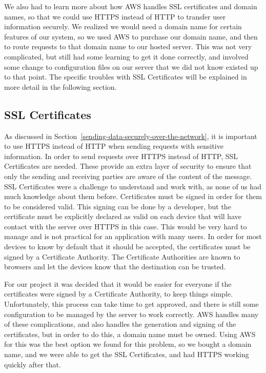 \documentclass[12pt]{report}
\let\Oldsubsection\subsection
\renewcommand{\subsection}{\FloatBarrier\Oldsubsection}
\begin{document}
We also had to learn more about how AWS handles SSL certificates and domain names,
so that we could use HTTPS instead of HTTP to transfer user information securely. We realized
we would need a domain name for certain features of our system, so we used AWS to purchase
our domain name, and then to route requests to that domain name to our hosted server. This was
not very complicated, but still had some learning to get it done correctly, and involved some
change to configuration files on our server that we did not know existed up to that point. The
specific troubles with SSL Certificates will be explained in more detail in the following section.

\subsection{SSL Certificates} \label{ssl-certificates}

As discussed in Section~\ref{sending-data-securely-over-the-network}, it is important to use HTTPS
instead of HTTP when sending requests with sensitive information.
In order to send requests over HTTPS instead of HTTP, SSL Certificates are needed.
These provide an extra layer of security to ensure that only the sending and receiving parties are
aware of the content of the message.
SSL Certificates were a challenge to understand and work with, as none of us had much
knowledge about them before. Certificates must be signed in order for them to be considered
valid. This signing can be done by a developer, but the certificate must be explicitly declared as
valid on each device that will have contact with the server over HTTPS in this case. This would
be very hard to manage and is not practical for an application with many users. In order for most
devices to know by default that it should be accepted, the certificates must be signed by a
Certificate Authority. The Certificate Authorities are known to browsers and let the devices know
that the destination can be trusted.

For our project it was decided that it would be easier for everyone if the certificates were
signed by a Certificate Authority, to keep things simple. Unfortunately, this process can take
time to get approved, and there is still some configuration to be managed by the server to work
correctly. AWS handles many of these complications, and also handles the generation and
signing of the certificates, but in order to do this, a domain name must be owned. Using AWS for
this was the best option we found for this problem, so we bought a domain name, and we were
able to get the SSL Certificates, and had HTTPS working quickly after that.
\end{document}
